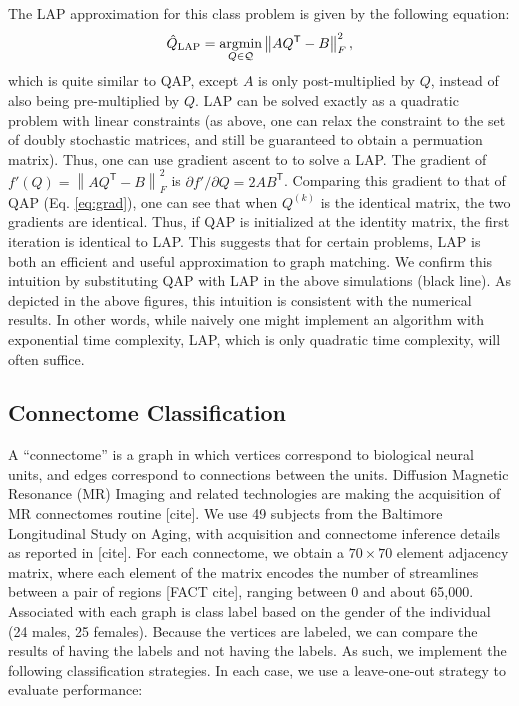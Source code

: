\documentclass{article} %
\providecommand{\norm}[1]{\left \lVert#1 \right  \rVert}
\newcommand{\argmin}{\operatornamewithlimits{argmin}}
\newcommand{\T}{^{\ensuremath{\mathsf{T}}}}           %
\providecommand{\mc}[1]{\mathcal{#1}}
\providecommand{\mh}[1]{\hat{#1}}
\begin{document}
The LAP approximation for this class problem is given by the following equation:
\begin{align} \label{eq:LAP}
	\mh{Q}_{\text{LAP}} = \argmin_{Q \in \mc{Q}} \norm{A Q\T - B }^2_F,
\end{align}
which is quite similar to QAP, except $A$ is only post-multiplied by $Q$, instead of also being pre-multiplied by $Q$. LAP can be solved exactly as a quadratic problem with linear constraints (as above, one can relax the constraint to the set of doubly stochastic matrices, and still be guaranteed to obtain a permuation matrix). Thus, one can use gradient ascent to to solve a LAP.  The gradient of $f'(Q)=\norm{AQ\T-B}_F^2$ is %
	$\partial f'/\partial Q = 2A B\T$. 
Comparing this gradient to that of QAP (Eq. \eqref{eq:grad}), one can see that when $Q^{(k)}$ is the identical matrix, the two gradients are identical.  Thus, if QAP is initialized at the identity matrix, the first iteration is identical to LAP.  This suggests that for certain problems, LAP is both an efficient and useful approximation to graph matching.  We confirm this intuition by substituting QAP with LAP in the above simulations (black line).  As depicted in the above figures, this intuition is consistent with the numerical results. In other words, while naively one might implement an algorithm with exponential time complexity, LAP, which is only quadratic time complexity, will often suffice.



\subsection{Connectome Classification} %
\label{sub:connectome_classification}

A ``connectome'' is a graph in which vertices correspond to biological neural units, and edges correspond to connections between the units.  Diffusion Magnetic Resonance (MR) Imaging and related technologies are making the acquisition of MR connectomes routine [cite].  We use 49 subjects from the Baltimore Longitudinal Study on Aging, with acquisition and connectome inference details as reported in [cite].  For each connectome, we obtain a $70 \times 70$ element adjacency matrix, where each element of the matrix encodes the number of streamlines between a pair of regions [FACT cite], ranging between 0 and about 65,000.  Associated with each graph is class label based on the gender of the individual (24 males, 25 females).  Because the vertices are labeled, we can compare the results of having the labels and not having the labels.  As such, we implement the following classification strategies.  In each case, we use a leave-one-out strategy to evaluate performance:
\end{document}

